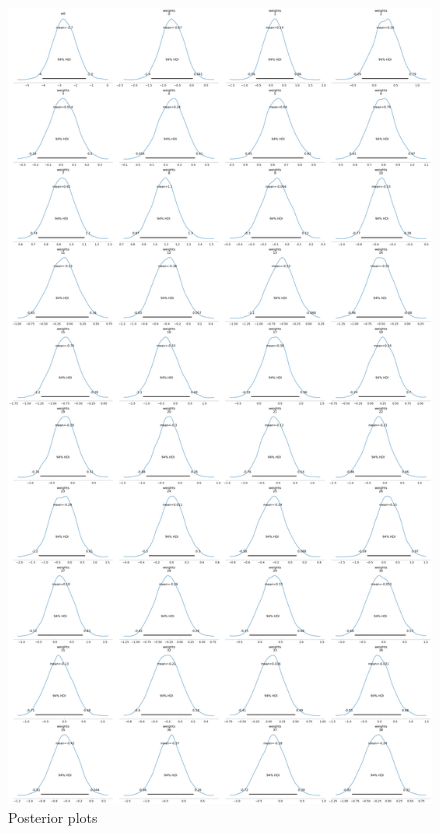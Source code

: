 \documentclass[letter]{article}
\begin{document}
\begin{figure}[H]
    \centering
    \includegraphics[scale=0.15]{appendix/posterior_plot.png}
    \caption{Posterior plots}
    \label{fig:plot_posterior}
\end{figure} 
\end{document}
